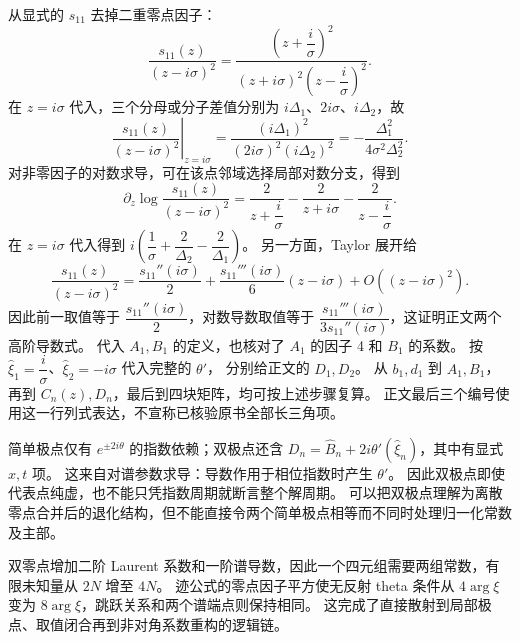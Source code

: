\documentclass[lang=cn,scheme=chinese,mode=simple,device=normal,color=blue,
math=cm,thmcnt=section,12pt]{elegantbook}
\begin{document}
\begin{callout}[计算：纯虚例子中不用猜测的高阶导数]
    从显式的 $s_{11}$ 去掉二重零点因子：
    \[
        \dfrac{s_{11}(z)}{(z-i\sigma)^2}
        =\dfrac{(z+\dfrac{i}{\sigma})^2}{(z+i\sigma)^2(z-\dfrac{i}{\sigma})^2}.
    \]
    在 $z=i\sigma$ 代入，三个分母或分子差值分别为
    $i\Delta_1$、$2i\sigma$、$i\Delta_2$，故
    \[
        \left.\dfrac{s_{11}(z)}{(z-i\sigma)^2}\right|_{z=i\sigma}
        =\dfrac{(i\Delta_1)^2}{(2i\sigma)^2(i\Delta_2)^2}
        =-\dfrac{\Delta_1^2}{4\sigma^2\Delta_2^2}.
    \]
    对非零因子的对数求导，可在该点邻域选择局部对数分支，得到
    \[
        \partial_z\log\dfrac{s_{11}(z)}{(z-i\sigma)^2}
        =\dfrac{2}{z+\dfrac{i}{\sigma}}-\dfrac{2}{z+i\sigma}-\dfrac{2}{z-\dfrac{i}{\sigma}}.
    \]
    在 $z=i\sigma$ 代入得到
    $i(\dfrac{1}{\sigma}+\dfrac{2}{\Delta_2}-\dfrac{2}{\Delta_1})$。
    另一方面，Taylor 展开给
    \[
        \dfrac{s_{11}(z)}{(z-i\sigma)^2}
        =\dfrac{s_{11}''(i\sigma)}{2}
        +\dfrac{s_{11}'''(i\sigma)}{6}(z-i\sigma)+O((z-i\sigma)^2).
    \]
    因此前一取值等于 $\dfrac{s_{11}''(i\sigma)}{2}$，对数导数取值等于
    $\dfrac{s_{11}'''(i\sigma)}{3s_{11}''(i\sigma)}$，这证明正文两个高阶导数式。
    代入 $A_1,B_1$ 的定义，也核对了 $A_1$ 的因子 4 和 $B_1$ 的系数。
    按 $\widehat\xi_1=\dfrac{i}{\sigma}$、$\widehat\xi_2=-i\sigma$ 代入完整的 $\theta'$，
    分别给正文的 $D_1,D_2$。
    从 $b_1,d_1$ 到 $A_1,B_1$，再到 $C_n(z),D_n$，最后到四块矩阵，均可按上述步骤复算。
    正文最后三个编号使用这一行列式表达，不宣称已核验原书全部长三角项。
\end{callout}

\begin{callout}[为什么双极点解与简单极点呼吸子不同]
    简单极点仅有 $e^{\pm2i\theta}$ 的指数依赖；双极点还含
    $D_n=\widehat B_n+2i\theta'(\widehat\xi_n)$，其中有显式 $x,t$ 项。
    这来自对谱参数求导：导数作用于相位指数时产生 $\theta'$。
    因此双极点即使代表点纯虚，也不能只凭指数周期就断言整个解周期。
    可以把双极点理解为离散零点合并后的退化结构，但不能直接令两个简单极点相等而不同时处理归一化常数及主部。
\end{callout}


\begin{callout}
    双零点增加二阶 Laurent 系数和一阶谱导数，因此一个四元组需要两组常数，有限未知量从 $2N$ 增至 $4N$。
    迹公式的零点因子平方使无反射 theta 条件从 $4\arg\xi$ 变为 $8\arg\xi$，跳跃关系和两个谱端点则保持相同。
    这完成了直接散射到局部极点、取值闭合再到非对角系数重构的逻辑链。
\end{callout}
\end{document}
